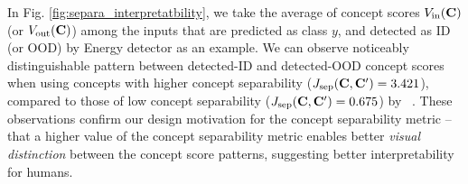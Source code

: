In Fig. \ref{fig:separa_interpretatbility}, we take the average of concept scores $V_{\textrm{in}}(\mathbf{C})$ (or $V_{\textrm{out}}(\mathbf{C})$) among the inputs that are predicted as class $y$, and detected as ID (or OOD) by Energy detector as an example.
We can observe noticeably distinguishable pattern between detected-ID and detected-OOD concept scores when using concepts with higher concept separability ($J_{\textrm{sep}}(\mathbf{C}, \mathbf{C}')=3.421$), compared to those of low concept separability ($J_{\textrm{sep}}(\mathbf{C}, \mathbf{C}')=0.675$) by ~\cite{yeh2020completeness}. 
These observations confirm our design motivation for the concept separability metric -- that a higher value of the concept separability metric enables better \textit{visual distinction} between the concept score patterns, suggesting better interpretability for humans.
\fi